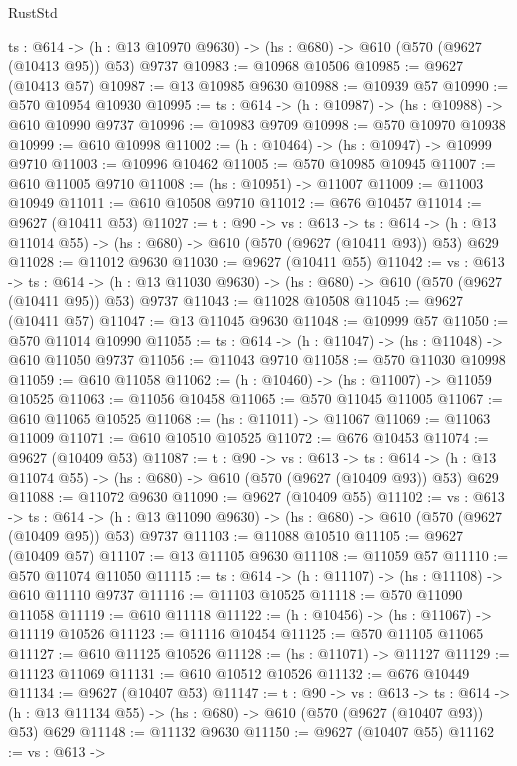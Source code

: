 \begin{lexlean}{RustStd}
\begin{coremodule}
  {ts : @614} -> (h : @13 @10970 @9630) -> (hs : @680) -> @610 (@570 (@9627 (@10413 @95)) @53) @9737
@10983 := @10968 @10506
@10985 := @9627 (@10413 @57)
@10987 := @13 @10985 @9630
@10988 := @10939 @57
@10990 := @570 @10954 @10930
@10995 := {ts : @614} -> (h : @10987) -> (hs : @10988) -> @610 @10990 @9737
@10996 := @10983 @9709
@10998 := @570 @10970 @10938
@10999 := @610 @10998
@11002 := (h : @10464) -> (hs : @10947) -> @10999 @9710
@11003 := @10996 @10462
@11005 := @570 @10985 @10945
@11007 := @610 @11005 @9710
@11008 := (hs : @10951) -> @11007
@11009 := @11003 @10949
@11011 := @610 @10508 @9710
@11012 := @676 @10457
@11014 := @9627 (@10411 @53)
@11027 := {t : @90} ->
  {vs : @613} ->
  {ts : @614} -> (h : @13 @11014 @55) -> (hs : @680) -> @610 (@570 (@9627 (@10411 @93)) @53) @629
@11028 := @11012 @9630
@11030 := @9627 (@10411 @55)
@11042 := {vs : @613} ->
  {ts : @614} -> (h : @13 @11030 @9630) -> (hs : @680) -> @610 (@570 (@9627 (@10411 @95)) @53) @9737
@11043 := @11028 @10508
@11045 := @9627 (@10411 @57)
@11047 := @13 @11045 @9630
@11048 := @10999 @57
@11050 := @570 @11014 @10990
@11055 := {ts : @614} -> (h : @11047) -> (hs : @11048) -> @610 @11050 @9737
@11056 := @11043 @9710
@11058 := @570 @11030 @10998
@11059 := @610 @11058
@11062 := (h : @10460) -> (hs : @11007) -> @11059 @10525
@11063 := @11056 @10458
@11065 := @570 @11045 @11005
@11067 := @610 @11065 @10525
@11068 := (hs : @11011) -> @11067
@11069 := @11063 @11009
@11071 := @610 @10510 @10525
@11072 := @676 @10453
@11074 := @9627 (@10409 @53)
@11087 := {t : @90} ->
  {vs : @613} ->
  {ts : @614} -> (h : @13 @11074 @55) -> (hs : @680) -> @610 (@570 (@9627 (@10409 @93)) @53) @629
@11088 := @11072 @9630
@11090 := @9627 (@10409 @55)
@11102 := {vs : @613} ->
  {ts : @614} -> (h : @13 @11090 @9630) -> (hs : @680) -> @610 (@570 (@9627 (@10409 @95)) @53) @9737
@11103 := @11088 @10510
@11105 := @9627 (@10409 @57)
@11107 := @13 @11105 @9630
@11108 := @11059 @57
@11110 := @570 @11074 @11050
@11115 := {ts : @614} -> (h : @11107) -> (hs : @11108) -> @610 @11110 @9737
@11116 := @11103 @10525
@11118 := @570 @11090 @11058
@11119 := @610 @11118
@11122 := (h : @10456) -> (hs : @11067) -> @11119 @10526
@11123 := @11116 @10454
@11125 := @570 @11105 @11065
@11127 := @610 @11125 @10526
@11128 := (hs : @11071) -> @11127
@11129 := @11123 @11069
@11131 := @610 @10512 @10526
@11132 := @676 @10449
@11134 := @9627 (@10407 @53)
@11147 := {t : @90} ->
  {vs : @613} ->
  {ts : @614} -> (h : @13 @11134 @55) -> (hs : @680) -> @610 (@570 (@9627 (@10407 @93)) @53) @629
@11148 := @11132 @9630
@11150 := @9627 (@10407 @55)
@11162 := {vs : @613} ->

\end{coremodule}
\end{lexlean}
